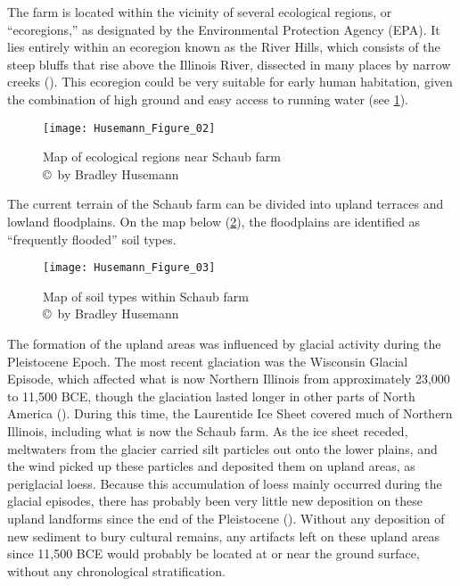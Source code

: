 
The farm is located within the vicinity of several ecological regions, or “ecoregions,” as designated by the Environmental Protection Agency (EPA). It lies entirely within an ecoregion known as the River Hills, which consists of the steep bluffs that rise above the Illinois River, dissected in many places by narrow creeks (\cite{epa}). This ecoregion could be very suitable for early human habitation, given the combination of high ground and easy access to running water (see \cref{fig:Husemann_Figure_02}).

\begin{figure}[!htb]
	\texttt{[image: Husemann\_Figure\_02]}
	\caption{Map of ecological regions near Schaub farm
		{\normalfont\scriptsize \\ \copyright\ by Bradley Husemann
	}}
	\label{fig:Husemann_Figure_02}
\end{figure}

The current terrain of the Schaub farm can be divided into upland terraces and lowland floodplains. On the map below (\cref{fig:Husemann_Figure_03}), the floodplains are identified as “frequently flooded” soil types.

\begin{figure}[!htb]
	\texttt{[image: Husemann\_Figure\_03]}
	\caption{Map of soil types within Schaub farm
		{\normalfont\scriptsize \\ \copyright\ by Bradley Husemann
	}}
	\label{fig:Husemann_Figure_03}
\end{figure}

The formation of the upland areas was influenced by glacial activity during the Pleistocene Epoch. The most recent glaciation was the Wisconsin Glacial Episode, which affected what is now Northern Illinois from approximately 23,000 to 11,500 BCE, though the glaciation lasted longer in other parts of North America (\cite{ehlers2004}). During this time, the Laurentide Ice Sheet covered much of Northern Illinois, including what is now the Schaub farm. As the ice sheet receded, meltwaters from the glacier carried silt particles out onto the lower plains, and the wind picked up these particles and deposited them on upland areas, as periglacial loess. Because this accumulation of loess mainly occurred during the glacial episodes, there has probably been very little new deposition on these upland landforms since the end of the Pleistocene (\cite{carroll1970}). Without any deposition of new sediment to bury cultural remains, any artifacts left on these upland areas since 11,500 BCE would probably be located at or near the ground surface, without any chronological stratification.

